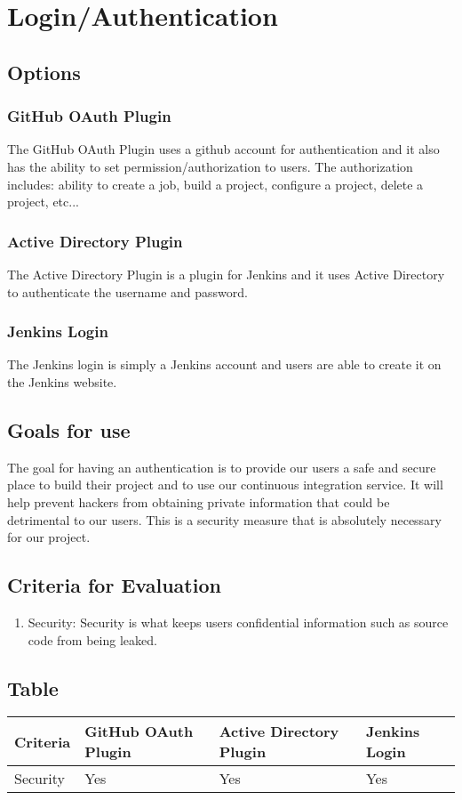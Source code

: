 \documentclass[10pt,letterpaper,onecolumn,journal]{IEEEtran}
\begin{document}
\section{Login/Authentication}
\subsection{Options}
\subsubsection{GitHub OAuth Plugin}
The GitHub OAuth Plugin uses a github account for authentication and it also has the ability to set permission/authorization to users. The authorization includes: ability to create a job, build a project, configure a project, delete a project, etc...
\subsubsection{Active Directory Plugin}
The Active Directory Plugin is a plugin for Jenkins and it uses Active Directory to authenticate the username and password.
\subsubsection{Jenkins Login}
The Jenkins login is simply a Jenkins account and users are able to create it on the Jenkins website.
\subsection{Goals for use}
The goal for having an authentication is to provide our users a safe and secure place to build their project and to use our continuous integration service.
It will help prevent hackers from obtaining private information that could be detrimental to our users.
This is a security measure that is absolutely necessary for our project.
\subsection{Criteria for Evaluation}
\begin{enumerate}
  \item Security: Security is what keeps users confidential information such as source code from being leaked.
\end{enumerate}
\subsection{Table}
\begin{center}
  \begin{tabular}{llll}
    Criteria & GitHub OAuth Plugin & Active Directory Plugin & Jenkins Login\\ \midrule
    Security       & Yes & Yes & Yes \\ \midrule
  \end{tabular}
\end{center}
\end{document}
